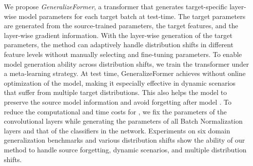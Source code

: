 We propose \textit{GeneralizeFormer}, a transformer that generates target-specific layer-wise model parameters for each target batch at test-time. 
The target parameters are generated from the source-trained parameters, the target features, and the layer-wise gradient information.
With the layer-wise generation of the target parameters, the method can adaptively handle distribution shifts in different feature levels without manually selecting and fine-tuning parameters.
To enable model generation ability across distribution shifts, we train the transformer under a meta-learning strategy. At test time, GeneralizeFormer achieves  without online optimization of the model, making it especially effective in dynamic scenarios that suffer from multiple target distributions. This also helps the model to preserve the source model information and avoid forgetting after model . To reduce the computational and time costs for , we fix the parameters of the convolutional layers while generating the parameters of all Batch Normalization layers and that of the classifiers in the network.
Experiments on six domain generalization benchmarks and various distribution shifts show the ability of our method to handle source forgetting, dynamic scenarios, and multiple distribution shifts.
